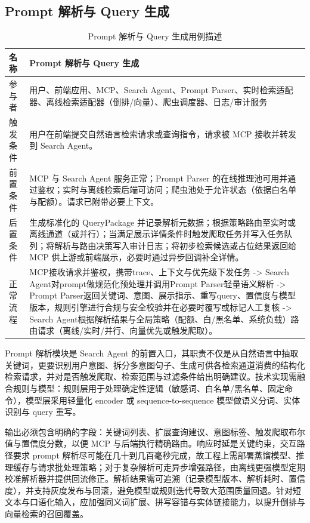 \subsection{Prompt 解析与 Query 生成}
\begin{table}[H]
\centering
\caption{Prompt 解析与 Query 生成用例描述}
\label{tab:nonperiodic-usecase}
{\renewcommand{\arraystretch}{1.}
\begin{tabular}{p{3cm} p{11cm}}
\hline
名称 & Prompt 解析与 Query 生成 \\ \hline
参与者 & 用户、前端应用、MCP、Search Agent、Prompt Parser、实时检索适配器、离线检索适配器（倒排/向量）、爬虫调度器、日志/审计服务 \\ \hline
触发条件 & 用户在前端提交自然语言检索请求或查询指令，请求被 MCP 接收并转发到 Search Agent。 \\ \hline
前置条件 & MCP 与 Search Agent 服务正常；Prompt Parser 的在线推理池可用并通过鉴权；实时与离线检索后端可访问；爬虫池处于允许状态（依据白名单与配额）。请求已附带必要上下文。 \\ \hline
后置条件 & 生成标准化的 QueryPackage 并记录解析元数据；根据策略路由至实时或离线通道（或并行）；当满足展示详情条件时触发爬取任务并写入任务队列；将解析与路由决策写入审计日志；将初步检索候选或占位结果返回给 MCP 供上游或前端展示，必要时通过异步回调补全详情。 \\ \hline
正常流程 &
MCP接收请求并鉴权，携带trace、上下文与优先级下发任务 -> Search Agent对prompt做规范化预处理并调用Prompt Parser轻量语义解析 -> Prompt Parser返回关键词、意图、展示指示、重写query、置信度与模型版本，规则引擎进行合规与安全校验并在必要时覆写或标记人工复核 -> Search Agent根据解析结果与全局策略（配额、白/黑名单、系统负载）路由请求（离线/实时/并行、向量优先或触发爬取）。\\
\hline
\end{tabular}
}
\end{table}
Prompt 解析模块是 Search Agent 的前置入口，其职责不仅是从自然语言中抽取关键词，更要识别用户意图、拆分多意图句子、生成可供各检索通道消费的结构化检索请求，并对是否触发爬取、检索范围与过滤条件给出明确建议。技术实现需融合规则与模型：规则层用于处理确定性逻辑（敏感词、白名单/黑名单、固定命令），模型层采用轻量化 encoder 或 sequence-to-sequence 模型做语义分词、实体识别与 query 重写。

输出必须包含明确的字段：关键词列表、扩展查询建议、意图标签、触发爬取布尔值与置信度分数，以便 MCP 与后端执行精确路由。响应时延是关键约束，交互路径要求 prompt 解析尽可能在几十到几百毫秒完成，故工程上需部署蒸馏模型、推理缓存与请求批处理策略；对于复杂解析可走异步增强路径，由离线更强模型定期校准解析器并提供回流修正。解析结果需可追溯（记录模型版本、解析耗时、置信度），并支持灰度发布与回滚，避免模型或规则迭代导致大范围质量回退。针对短文本与口语化输入，应加强同义词扩展、拼写容错与实体链接能力，以提升倒排与向量检索的召回覆盖。

